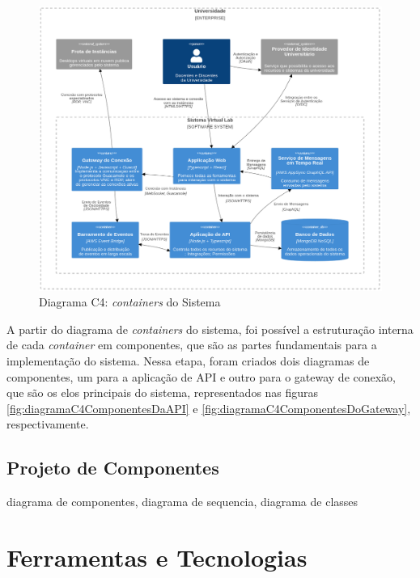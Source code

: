 \begin{figure}[H]
\caption{Diagrama C4: \textit{containers} do Sistema}
\label{fig:diagramaC4ConteineresDoSistema}
\includegraphics[width=\textwidth]{capitulos/2-metodologia/files/c4-container.png}
\end{figure}

A partir do diagrama de \textit{containers} do sistema, foi possível a estruturação interna de cada \textit{container} em componentes, que são as partes fundamentais para a implementação do sistema.
Nessa etapa, foram criados dois diagramas de componentes, um para a aplicação de API e outro para o gateway de conexão, que são os elos principais do sistema, representados nas figuras \autoref{fig:diagramaC4ComponentesDaAPI} e \autoref{fig:diagramaC4ComponentesDoGateway}, respectivamente.


\subsection{Projeto de Componentes}
\label{subsec:projetoDeComponentes}
% 

diagrama de componentes, diagrama de sequencia, diagrama de classes


\section{Ferramentas e Tecnologias}
\label{sec:ferramentasETecnologias}

